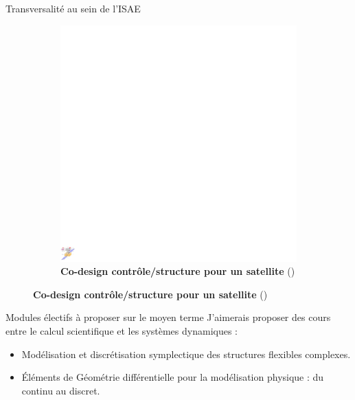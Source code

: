 \documentclass[aspectratio=169, french]{ISAE-Beamer}
\begin{document}
\begin{frame}{Transversalité au sein de l'ISAE}
\begin{figure}[t]
\begin{subfigure}[t]{0.45\textwidth}
		\includegraphics[height=.5\textheight]{Codesign_satellite.pdf} 
		\caption*{\textbf{Co-design contrôle/structure pour un satellite} (\cite{finozzi2022sub})}
	\end{subfigure}
\end{figure}

\end{frame}


\begin{frame}{Modules électifs à proposer sur le moyen terme}
J'aimerais proposer des cours entre le calcul scientifique et les systèmes dynamiques :
\begin{itemize}
	\item Modélisation et discrétisation symplectique des structures flexibles complexes.
	\item Éléments de Géométrie différentielle pour la modélisation physique : du continu au discret.
\end{itemize}
\end{frame}
	





	
	

\end{document}

